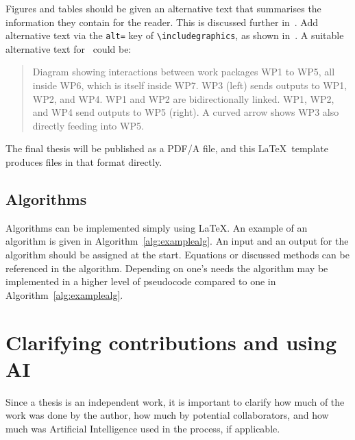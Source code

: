 Figures and tables should be given an alternative text that summarises
the information they contain for the reader. This is discussed further
in~. Add alternative text via the \texttt{alt=}
key of \verb|\includegraphics|, as shown in~.
A suitable alternative text for~ could be:

\begin{quote}
Diagram showing interactions between work packages WP1 to WP5, all
inside WP6, which is itself inside WP7. WP3 (left) sends outputs to
WP1, WP2, and WP4. WP1 and WP2 are bidirectionally linked. WP1,
WP2, and WP4 send outputs to WP5 (right). A curved arrow shows WP3
also directly feeding into WP5.
\end{quote}

The final thesis will be published as a PDF/A file, and this \LaTeX\
template produces files in that format directly.

\subsection{Algorithms}
Algorithms can be implemented simply using \LaTeX. An example of an
algorithm is given in Algorithm~\ref{alg:examplealg}. An input and an
output for the algorithm should be assigned at the start. Equations
or discussed methods can be referenced in the algorithm. Depending on
one's needs the algorithm may be implemented in a higher level of
pseudocode compared to one in Algorithm~\ref{alg:examplealg}.

\vspace{7mm}
\begin{algorithm}[H]
\SetAlgoLined
\DontPrintSemicolon
{}
\caption{Selection Sort}
\label{alg:examplealg}
\end{algorithm}

\section{Clarifying contributions and using AI}
\label{AI}
Since a thesis is an independent work, it is important to clarify how
much of the work was done by the author, how much by potential
collaborators, and how much was Artificial Intelligence used in the
process, if applicable.


